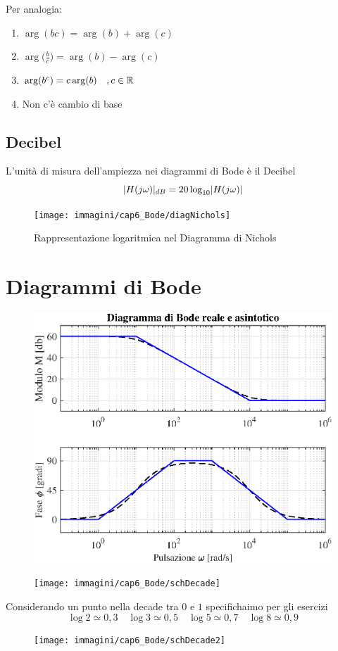 Per analogia:
\begin{enumerate}
	\item $ \arg ( b c) = \arg (b) + \arg (c) $
	\item $ \arg \Big(\frac{b}{c}\Big) = \arg (b) - \arg (c) $
	\item $ \arg (b^c) = c \arg (b) \quad ,c \in \mathbb{R}$
	\item Non c'è cambio di base
\end{enumerate}

\subsection{Decibel}
L'unità di misura dell'ampiezza nei diagrammi di Bode è il Decibel
\[
\lvert H(j\omega)\rvert_{dB} = 20 \log_{10}\lvert H(j\omega)\rvert
\]

\begin{figure}[H]
	\centering
	\texttt{[image: immagini/cap6\_Bode/diagNichols]}
	\caption{ Rappresentazione logaritmica nel Diagramma di Nichols  }
	\label{fig:diagNichols}
\end{figure}

\section{Diagrammi di Bode}
\begin{figure}[H]
	\centering
	\includegraphics[width=0.7\linewidth]{immagini/cap6_Bode/diagBode}
	\label{fig:diagBode}
\end{figure}


\begin{figure}[H]
	\centering
	\texttt{[image: immagini/cap6\_Bode/schDecade]}
	\label{fig:schDecade}
\end{figure}
Considerando un punto nella decade tra $ 0 $ e $ 1 $ specifichaimo per gli esercizi
\[ 
	\log 2 \simeq 0,3 \quad \log 3 \simeq 0,5 \quad\log 5 \simeq 0,7 \quad\log 8 \simeq 0,9 
 \]
\begin{figure}[H]
	\centering
	\texttt{[image: immagini/cap6\_Bode/schDecade2]}
	\label{fig:schDecade2}
\end{figure}

